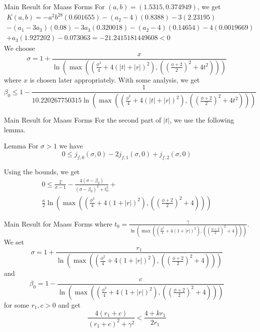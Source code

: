\documentclass{beamer}
\begin{document}
\begin{frame}{Main Result for Maass Forms}
    For $(a,b) = (1.5315,0.374949)$, we get \begin{multline*}
    K(a,b) =   -a^2b^28(0.601655) -(a_2-4)(0.8388)-3(2.23195)\\ -(a_1-3a_3)(0.08) -3a_3(0.320018)-(a_2-4)(0.14654) - 4(0.0019669) \\+a_3(1.927202)-0.073063  =  -21.2415181449608<0
\end{multline*}
We choose $$\sigma = 1+\frac{x}{\ln \left(\max \left(\left( \frac{\phi^2}{4} + 4(|t|+|r|)^2\right),\left( \left(\frac{\phi+2}{2}\right)^2 +4t^2 \right) \right)\right)}$$ where $x$ is chosen later appropriately. 
With some analysis, we get \[
\beta_0 \leq 1-\frac{1}{10.220267750315\ln \left(\max \left(\left( \frac{\phi^2}{4} + 4(|t|+|r|)^2\right),\left( \left(\frac{\phi+2}{2}\right)^2 +4t^2 \right) \right)\right) }
\]
\end{frame}
\begin{frame}{Main Result for Maass Forms}
    For the second part of $|t|$, we use the following lemma.
    \begin{block}{Lemma}
            For $\sigma>1$ we have\[
    0\leq j_{f,0}(\sigma,0) -2j_{f,1}(\sigma,0) +j_{f,2}(\sigma,0) 
    \]
    \end{block}
Using the bounds, we get \begin{multline*}
    0 \leq \frac{2}{\sigma-1}-\frac{4(\sigma-\beta_0)}{(\sigma-\beta_0)^2+t_0^2}+\\ \frac{\kappa}{2}\ln\left(\max \left(\left( \frac{\phi^2}{4} + 4(1+|r|)^2\right),\left( \left(\frac{\phi+2}{2}\right)^2 +4 \right) \right)\right) 
\end{multline*}
\end{frame}
\begin{frame}{Main Result for Maass Forms}
    where $t_0 = \frac{\gamma}{\ln\left(\max \left(\left( \frac{\phi^2}{4} + 4(1+|r|)^2\right),\left( \left(\frac{\phi+2}{2}\right)^2 +4 \right) \right)\right)}$.\\
    We set $$\sigma = 1+\frac{r_1}{\ln\left(\max \left(\left( \frac{\phi^2}{4} + 4(1+|r|)^2\right),\left( \left(\frac{\phi+2}{2}\right)^2 +4 \right) \right)\right) }$$ and $$\beta_0 = 1-\frac{c}{\ln\left(\max \left(\left( \frac{\phi^2}{4} + 4(1+|r|)^2\right),\left( \left(\frac{\phi+2}{2}\right)^2 +4 \right) \right)\right)   }$$ for some $r_1,c >0$
and get \[
\frac{4(r_1+c)}{(r_1+c)^2+\gamma^2} < \frac{4+kr_1}{2r_1}
\]

\end{frame}
\end{document}
